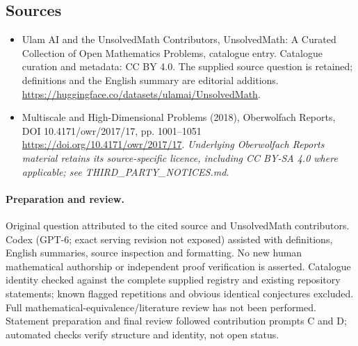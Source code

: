 \documentclass[11pt]{article}
\begin{document}
\subsection{Sources}
\begin{itemize}
\item[\hypertarget{source:statement:1}{S1}] Ulam AI and the UnsolvedMath Contributors, UnsolvedMath: A Curated Collection of Open Mathematics Problems, catalogue entry. Catalogue curation and metadata: CC BY 4.0. The supplied source question is retained; definitions and the English summary are editorial additions.
\url{https://huggingface.co/datasets/ulamai/UnsolvedMath}.
\item[\hypertarget{source:statement:2}{S2}] Multiscale and High-Dimensional Problems (2018), Oberwolfach Reports, DOI 10.4171/owr/2017/17, pp. 1001--1051
\url{https://doi.org/10.4171/owr/2017/17}.
\textit{Underlying Oberwolfach Reports material retains its source-specific licence, including CC BY-SA 4.0 where applicable; see THIRD\_PARTY\_NOTICES.md.}
\end{itemize}
\paragraph{Preparation and review.}
Original question attributed to the cited source and UnsolvedMath contributors. Codex (GPT-6; exact serving revision not exposed) assisted with definitions, English summaries, source inspection and formatting. No new human mathematical authorship or independent proof verification is asserted. Catalogue identity checked against the complete supplied registry and existing repository statements; known flagged repetitions and obvious identical conjectures excluded. Full mathematical-equivalence/literature review has not been performed. Statement preparation and final review followed contribution prompts C and D; automated checks verify structure and identity, not open status.
\label{end:statement}
\end{document}
